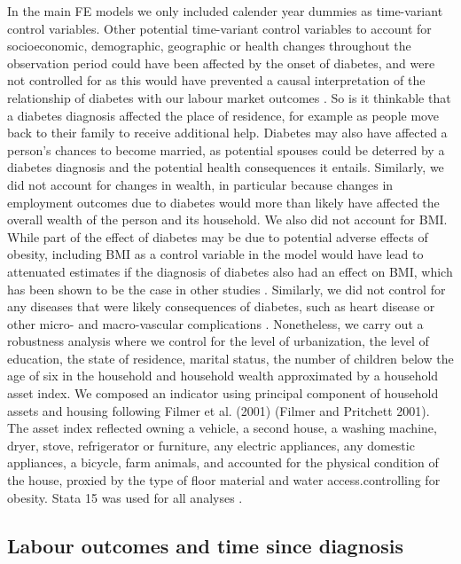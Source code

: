 \documentclass[12pt,english]{article}
\begin{document}
In the main \ac{FE} models we only included calender year dummies as time-variant control variables. Other potential time-variant control variables to account for socioeconomic, demographic, geographic or health changes throughout the observation period could have been affected by the onset of diabetes, and were not controlled for as this would have prevented a causal interpretation of the relationship of diabetes with our labour market outcomes \parencite{Angrist2009a}. So is it thinkable that a diabetes diagnosis affected the place of residence, for example as people move back to their family to receive additional help. Diabetes may also have affected a person's chances to become married, as potential  spouses could be deterred by a diabetes diagnosis and the potential health consequences it entails. Similarly, we did not account for changes in wealth, in particular because changes in employment outcomes due to diabetes would more than likely have affected the overall wealth of the person and its household. We also did not account for \ac{BMI}. While part of the effect of diabetes may be due to potential adverse effects of obesity, including \ac{BMI} as a control variable in the model would have lead to attenuated estimates if the diagnosis of diabetes also had an effect on \ac{BMI}, which has been shown to be the case in other studies \parencite{Slade2012,DeFineOlivarius2015,Seuring2018}. Similarly, we did not control for any diseases that were likely consequences of diabetes, such as heart disease or other micro- and macro-vascular complications \parencite{WorldHealthOrganization2016}. Nonetheless, we carry out a robustness analysis where we control for  the level of urbanization, the level of education, the state of residence, marital status, the number of children below the age of six in the household and household wealth approximated by a household asset index. We composed an indicator using principal component of household assets and housing following Filmer et al. (2001) (Filmer and Pritchett 2001). The asset index reflected owning a vehicle, a second house, a washing machine, dryer, stove, refrigerator or furniture, any electric appliances, any domestic appliances, a bicycle, farm animals, and accounted for the physical condition of the house, proxied by the type of floor material and water access.controlling for obesity. Stata 15 was used for all analyses \parencite{StataCorp2017}.


\subsection{Labour outcomes and time since diagnosis}
\end{document}
